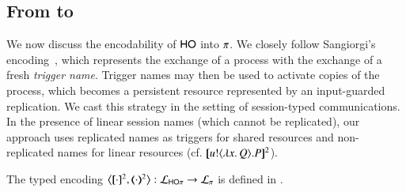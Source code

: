 \documentclass[runningheads]{llncs}
\begin{document}
{\subsection{From \HOp to \sessp}
\label{subsec:HOp_to_sessp}
\noi 
We now discuss the encodability of  $\mathsf{HO}$ into $\pi$. %
We closely follow Sangiorgi's encoding~\cite{San92,SaWabook}, which represents 
the exchange of a process with the exchange of a fresh \emph{trigger name}. 
Trigger names may then be used to activate copies of the process, which becomes a persistent resource represented by an input-guarded replication.
We cast this strategy in the setting of session-typed communications. 
In the presence of linear session names (which cannot be replicated),
our
approach %
 uses replicated names
as triggers for shared resources and non-replicated names
for linear resources (cf. $[\!\![u ! \langle \lambda x.\,Q \rangle . P]\!\!]^2$).


\begin{definition}
\label{d:enc:hopitopi}
The typed encoding 
$\enco{\map{\cdot}^{2}, \mapt{\cdot}^{2} %
}: \tyl{L}_{\HOp} \to \tyl{L}_{\sessp}$  
is defined
in . 
\end{definition}

}
\end{document}
